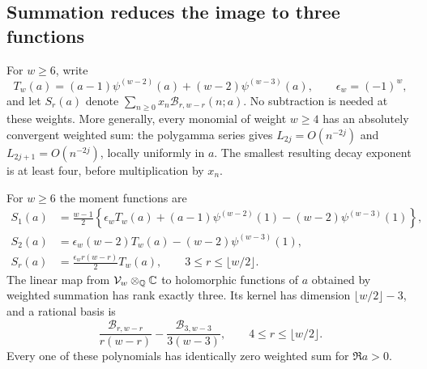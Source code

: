 \subsection{Summation reduces the image to three functions}

For $w\ge6$, write
\begin{equation}
 T_w(a)=(a-1)\psi^{(w-2)}(a)+(w-2)\psi^{(w-3)}(a),
 \qquad \epsilon_w=(-1)^w,
 \label{bell:T}
\end{equation}
and let $S_r(a)$ denote
$\sum_{n\ge0}x_n\mathcal B_{r,w-r}(n;a)$.
No subtraction is needed at these weights. More generally, every
monomial of weight $w\ge4$ has an absolutely convergent weighted sum:
the polygamma series gives
$L_{2j}=O(n^{-2j})$ and $L_{2j+1}=O(n^{-2j})$, locally uniformly in
$a$. The smallest resulting decay exponent is at least four, before
multiplication by $x_n$.

\begin{theorem}
\label{bell:image}
For $w\ge6$ the moment functions are
\begin{align}
 S_1(a)&=\frac{w-1}{2}\left\{
 \epsilon_wT_w(a)+(a-1)\psi^{(w-2)}(1)
                  -(w-2)\psi^{(w-3)}(1)\right\},\label{bell:S1}\\
 S_2(a)&=\epsilon_w(w-2)T_w(a)-(w-2)\psi^{(w-3)}(1),\label{bell:S2}\\
 S_r(a)&=\frac{\epsilon_wr(w-r)}2T_w(a),
 \qquad 3\le r\le\lfloor w/2\rfloor.\label{bell:Sr}
\end{align}
The linear map from $\mathcal V_w\otimes_{\mathbb Q}\mathbb C$ to holomorphic
functions of $a$ obtained by weighted summation has rank exactly three.
Its kernel has dimension $\lfloor w/2\rfloor-3$, and a rational basis is
\begin{equation}
 \frac{\mathcal B_{r,w-r}}{r(w-r)}
       -\frac{\mathcal B_{3,w-3}}{3(w-3)},
 \qquad 4\le r\le\lfloor w/2\rfloor.
 \label{bell:kernelbasis}
\end{equation}
Every one of these polynomials has identically zero weighted sum for
$\Re a>0$.
\end{theorem}

